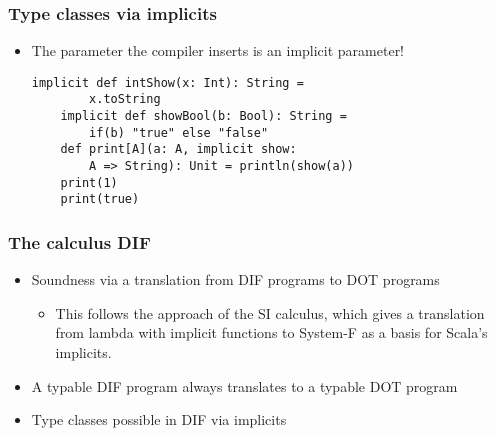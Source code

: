 \begin{frame}[fragile]
    \frametitle{Type classes via implicits}
    \begin{itemize}
        \pause
        \item The parameter the compiler inserts is an implicit parameter!
        \pause
        \begin{lstlisting}[mathescape]
    implicit def intShow(x: Int): String =
        x.toString
    implicit def showBool(b: Bool): String =
        if(b) "true" else "false"
    def print[A](a: A, implicit show:
        A => String): Unit = println(show(a))
    print(1)
    print(true)
        \end{lstlisting}
    \end{itemize}
\end{frame}

\begin{frame}
    \frametitle{The calculus DIF}
    \begin{itemize}
        \pause \item Soundness via a translation from DIF programs to DOT
            programs
        \begin{itemize}
            \pause \item This follows the approach of the SI calculus, which
                gives a translation from lambda with implicit functions to
                System-F as a basis for Scala's implicits.
        \end{itemize}
        \pause \item A typable DIF program always translates to a typable DOT
            program
        \pause \item Type classes possible in DIF via implicits
    \end{itemize}
\end{frame}

